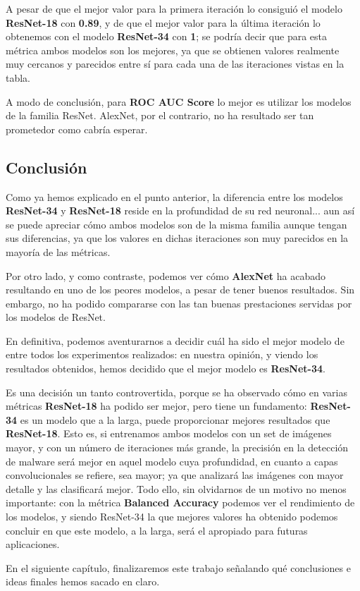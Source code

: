 A pesar de que el mejor valor para la primera iteración lo consiguió el modelo \textbf{ResNet-18} con \textbf{0.89}, y de que el mejor valor para la última iteración lo obtenemos con el modelo \textbf{ResNet-34} con \textbf{1}; se podría decir que para esta métrica ambos modelos son los mejores, ya que se obtienen valores realmente muy cercanos y parecidos entre sí para cada una de las iteraciones vistas en la tabla.

A modo de conclusión, para \textbf{ROC AUC Score} lo mejor es utilizar los modelos de la familia ResNet. AlexNet, por el contrario, no ha resultado ser tan prometedor como cabría esperar.

\subsection{Conclusión}

Como ya hemos explicado en el punto anterior, la diferencia entre los modelos \textbf{ResNet-34} y \textbf{ResNet-18} reside en la profundidad de su red neuronal... aun así se puede apreciar cómo ambos modelos son de la misma familia aunque tengan sus diferencias, ya que los valores en dichas iteraciones son muy parecidos en la mayoría de las métricas.

Por otro lado, y como contraste, podemos ver cómo \textbf{AlexNet} ha acabado resultando en uno de los peores modelos, a pesar de tener buenos resultados. Sin embargo, no ha podido compararse con las tan buenas prestaciones servidas por los modelos de ResNet.

En definitiva, podemos aventurarnos a decidir cuál ha sido el mejor modelo de entre todos los experimentos realizados: en nuestra opinión, y viendo los resultados obtenidos, hemos decidido que el mejor modelo es \textbf{ResNet-34}.

Es una decisión un tanto controvertida, porque se ha observado cómo en varias métricas \textbf{ResNet-18} ha podido ser mejor, pero tiene un fundamento: \textbf{ResNet-34} es un modelo que a la larga, puede proporcionar mejores resultados que \textbf{ResNet-18}. Esto es, si entrenamos ambos modelos con un set de imágenes mayor, y con un número de iteraciones más grande, la precisión en la detección de malware será mejor en aquel modelo cuya profundidad, en cuanto a capas convolucionales se refiere, sea mayor; ya que analizará las imágenes con mayor detalle y las clasificará mejor. Todo ello, sin olvidarnos de un motivo no menos importante: con la métrica \textbf{Balanced Accuracy} podemos ver el rendimiento de los modelos, y siendo ResNet-34 la que mejores valores ha obtenido podemos concluir en que este modelo, a la larga, será el apropiado para futuras aplicaciones.

En el siguiente capítulo, finalizaremos este trabajo señalando qué conclusiones e ideas finales hemos sacado en claro.
